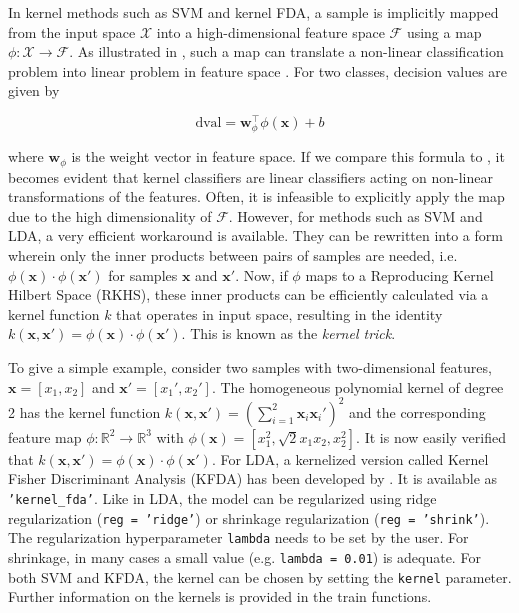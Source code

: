 \documentclass[utf8]{frontiersSCNS} %
\newcommand{\w}{\mathbf{w}}
\newcommand{\x}{\mathbf{x}}
\newcommand{\R}{\mathbb{R}}
\newcommand{\ttt}[1]{\texttt{#1}}
\begin{document}
In kernel methods such as SVM and kernel FDA, a sample is implicitly mapped from the input space $\mathcal{X}$ into a high-dimensional feature space $\mathcal{F}$ using a map $\phi:\mathcal{X}\rightarrow\mathcal{F}$. As illustrated in , such a map can translate a non-linear classification problem into linear problem in feature space \citep{Scholkopf2001LearningBeyond}. For two classes, decision values are given by

\begin{equation}
\label{eq:kernel_dval}
\text{dval} = \w_\phi^\top\phi(\x) + b
\end{equation}

where $\w_\phi$ is the weight vector in feature space. If we compare this formula to , it becomes evident that kernel classifiers are linear classifiers acting on non-linear transformations of the features. Often, it is  infeasible to explicitly apply the map due to the high dimensionality of $\mathcal{F}$.  However, for methods such as SVM and LDA, a very efficient workaround is available. They can be rewritten into a form wherein only the inner products between pairs of samples are needed, i.e. $\phi(\x)\cdot\phi(\x')$ for samples $\x$ and $\x'$. Now, if $\phi$ maps to a Reproducing Kernel Hilbert Space (RKHS), these inner products can be efficiently calculated via a kernel function $k$ that operates in input space, resulting in the identity $k(\x,\x') = \phi(\x)\cdot\phi(\x')$. This is known as the \textit{kernel trick}.

To give a simple example, consider two samples with  two-dimensional features, $\x = [x_1, x_2]$ and $\x' = [x_1', x_2']$. The homogeneous polynomial kernel of degree 2 has the kernel function $k(\x,\x') = (\sum_{i=1}^2 \x_i\x_i')^2$ and the corresponding feature map $\phi:\R^2\rightarrow\R^3$ with $\phi(\x)= [x_1^2, \sqrt{2}x_1 x_2, x_2^2]$. It is now easily verified that $k(\x,\x') = \phi(\x)\cdot\phi(\x')$. For LDA, a kernelized version called Kernel Fisher Discriminant Analysis (KFDA) has been developed by \cite{Mika1999FisherKernels}. It is available as \ttt{'kernel\_fda'}. Like in LDA, the model can be regularized using ridge regularization (\ttt{reg = 'ridge'}) or shrinkage regularization (\ttt{reg = 'shrink'}). The regularization hyperparameter \ttt{lambda} needs to be set by the user. For shrinkage, in many cases a small value (e.g. \ttt{lambda = 0.01}) is adequate. For both SVM and KFDA, the kernel can be chosen by setting the \ttt{kernel} parameter. Further information on the kernels is provided in the train functions.
\end{document}
